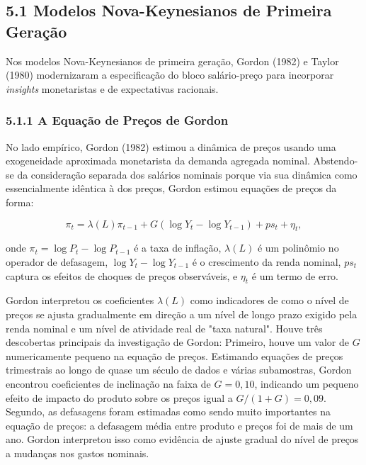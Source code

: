 \documentclass[12pt]{article}
\begin{document}
\subsection{5.1 Modelos Nova-Keynesianos de Primeira Geração}

Nos modelos Nova-Keynesianos de primeira geração, Gordon (1982) e Taylor (1980) modernizaram a especificação do bloco salário-preço para incorporar \textit{insights} monetaristas e de expectativas racionais.

\subsubsection{5.1.1 A Equação de Preços de Gordon} No lado empírico, Gordon (1982) estimou a dinâmica de preços usando uma exogeneidade aproximada monetarista da demanda agregada nominal. Abstendo-se da consideração separada dos salários nominais porque via sua dinâmica como essencialmente idêntica à dos preços, Gordon estimou equações de preços da forma:

\begin{equation}
\pi_t = \lambda(L)\pi_{t-1} + G(\log Y_t - \log Y_{t-1}) + ps_t + \eta_t, \tag{5.1}
\end{equation}

onde $\pi_t = \log P_t - \log P_{t-1}$ é a taxa de inflação, $\lambda(L)$ é um polinômio no operador de defasagem, $\log Y_t - \log Y_{t-1}$ é o crescimento da renda nominal, $ps_t$ captura os efeitos de choques de preços observáveis, e $\eta_t$ é um termo de erro.

Gordon interpretou os coeficientes $\lambda(L)$ como indicadores de como o nível de preços se ajusta gradualmente em direção a um nível de longo prazo exigido pela renda nominal e um nível de atividade real de "taxa natural". Houve três descobertas principais da investigação de Gordon: Primeiro, houve um valor de $G$ numericamente pequeno na equação de preços. Estimando equações de preços trimestrais ao longo de quase um século de dados e várias subamostras, Gordon encontrou coeficientes de inclinação na faixa de $G = 0,10$, indicando um pequeno efeito de impacto do produto sobre os preços igual a $G/(1+G) = 0,09$. Segundo, as defasagens foram estimadas como sendo muito importantes na equação de preços: a defasagem média entre produto e preços foi de mais de um ano. Gordon interpretou isso como evidência de ajuste gradual do nível de preços a mudanças nos gastos nominais.
\end{document}
